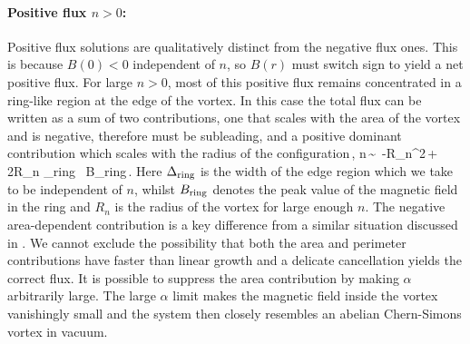 \paragraph{Positive flux $n>0$:} Positive flux solutions are qualitatively distinct from the negative flux ones.  This is because $B(0)<0$ independent of $n$, so 
$B(r)$ must switch sign to yield a net positive flux.  For large $n>0$, most of this positive flux remains concentrated in a ring-like region at the edge of the vortex. In this case the total flux can be written as a sum of two contributions, one that scales with the area of the vortex and is negative, therefore must be subleading, and a positive dominant contribution which scales with the radius of the configuration\,,
\pi n\,\sim\, -\pi R_n^2\,+\, 2\pi R_n \Delta_{\rm ring} \, B_{\rm ring}\,.\label{ringansatz}
\ee
Here $\Delta_{\rm ring}$ is the width of the  edge region which we take to be independent of $n$, whilst 
$B_{\rm ring}$
denotes the peak value of the magnetic field in the ring and $R_n$ 
is the radius of the vortex for large enough $n$. The negative area-dependent contribution  is a key difference from a similar situation discussed in \cite{Bolognesi:2007ez}.  We cannot exclude the possibility that both the area and perimeter 
contributions have faster than linear growth and a delicate cancellation yields the correct flux. It is possible to suppress the area contribution by making $\alpha$ arbitrarily large. The large $\alpha$ limit makes the magnetic field inside the vortex vanishingly small and the system then closely resembles an abelian  Chern-Simons vortex in vacuum.  

